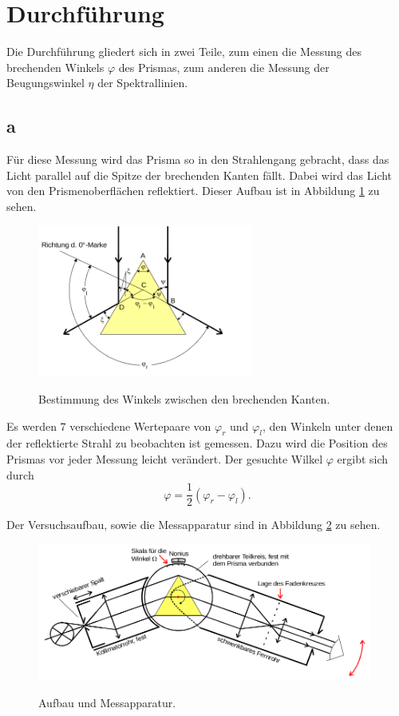 \section{Durchführung}
\label{sec:Durchführung}
Die Durchführung gliedert sich in zwei Teile, zum einen die Messung
des brechenden Winkels $\varphi$ des Prismas, zum anderen die Messung
der Beugungswinkel $\eta$ der Spektrallinien.

\subsection{a}%
Für diese Messung wird das Prisma so in den Strahlengang gebracht, dass
das Licht parallel auf die Spitze der brechenden Kanten fällt.
Dabei wird das Licht von den Prismenoberflächen reflektiert.
Dieser Aufbau ist in Abbildung \ref{fig:phi} zu sehen.

\begin{figure}[H]
  \centering
  \includegraphics[height=5cm]{dreh.png}
  \caption{Bestimmung des Winkels zwischen den brechenden Kanten.}
  \label{fig:phi}
  \cite{skript}
\end{figure}

Es werden 7 verschiedene Wertepaare von $\varphi_r$ und $\varphi_l$,
den Winkeln unter denen der reflektierte Strahl zu beobachten ist
gemessen. Dazu wird die Position des Prismas vor jeder Messung leicht
verändert.
Der gesuchte Wilkel $\varphi$ ergibt sich durch
\begin{equation}
  \varphi=\frac{1}{2}(\varphi_r-\varphi_l).
  \label{eqn:phi}
\end{equation}

Der Versuchsaufbau, sowie die Messapparatur sind in Abbildung
\ref{fig:aufbau} zu sehen.

\begin{figure}
  \centering
  \includegraphics[width=11cm]{aufbau.png}
  \caption{Aufbau und Messapparatur.}
  \label{fig:aufbau}
  \cite{skript}
\end{figure}


